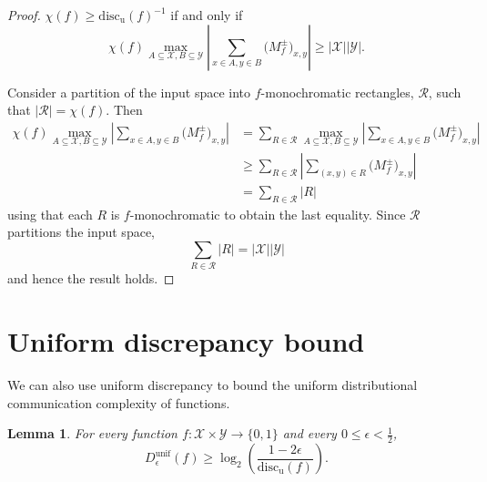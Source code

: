\documentclass[11pt]{amsart}
\theoremstyle{plain}
\newtheorem{lemma}{Lemma}
\theoremstyle{definition}
\theoremstyle{plain}
\newcommand{\calX}{\mathcal{X}}
\newcommand{\calY}{\mathcal{Y}}
\newcommand{\discu}{\mathrm{disc_u}}
\begin{document}
\begin{proof}
$\chi(f) \geq \discu(f)^{-1}$ if and only if
$$\chi(f)\max_{A \subseteq \calX, B \subseteq \calY}\left| \sum_{x \in A, y \in B} \big(M^{\pm}_f\big)_{x,y} \right| \geq |\calX||\calY|.$$

Consider a partition of the input space into $f$-monochromatic rectangles, $\mathcal R$, such that $|\mathcal R| = \chi(f)$. Then
\begin{align*}\chi(f)\max_{A \subseteq \calX, B \subseteq \calY}\left| \sum_{x \in A, y \in B} \big(M^{\pm}_f\big)_{x,y} \right|  &= \sum_{R\in \mathcal R} \max_{A \subseteq \calX, B \subseteq \calY}\left| \sum_{x \in A, y \in B} \big(M^{\pm}_f\big)_{x,y} \right|\\
&\geq\sum_{R \in \mathcal{R}} \left| \sum_{(x,y) \in R} \big(M^{\pm}_f\big)_{x,y} \right|\\
&= \sum_{R \in \mathcal R} |R|
\end{align*}
using that each $R$ is $f$-monochromatic to obtain the last equality. Since $\mathcal R$ partitions the input space,
$$\sum_{R \in \mathcal R} |R| = |\calX||\calY|$$
and hence the result holds.
\end{proof}


\newpage \section{Uniform discrepancy bound}

We can also use uniform discrepancy to bound the uniform distributional  communication complexity of functions.

\begin{lemma}
For every function $f : \calX \times \calY \to \{0,1\}$ and every $0 \le \epsilon < \frac12$, 
\[
D_\epsilon^{\mathrm{unif}}(f) \ge \log_2 \left( \frac{1-2\epsilon}{\discu(f)} \right).
\]
\end{lemma}
\end{document}
